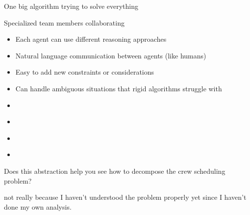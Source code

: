 
 One big algorithm trying to solve everything

 Specialized team members collaborating


\begin{itemize}
\item Each agent can use different reasoning approaches
\end{itemize}
\begin{itemize}
\item Natural language communication between agents (like humans)
\end{itemize}
\begin{itemize}
\item Easy to add new constraints or considerations
\end{itemize}
\begin{itemize}
\item Can handle ambiguous situations that rigid algorithms struggle with
\end{itemize}


\begin{itemize}
\item {}
\end{itemize}
\begin{itemize}
\item {}
\end{itemize}
\begin{itemize}
\item {}
\end{itemize}
\begin{itemize}
\item {}
\end{itemize}

Does this abstraction help you see how to decompose the crew scheduling problem?


not really because I haven't understood the problem properly yet since I haven't done my own analysis.


